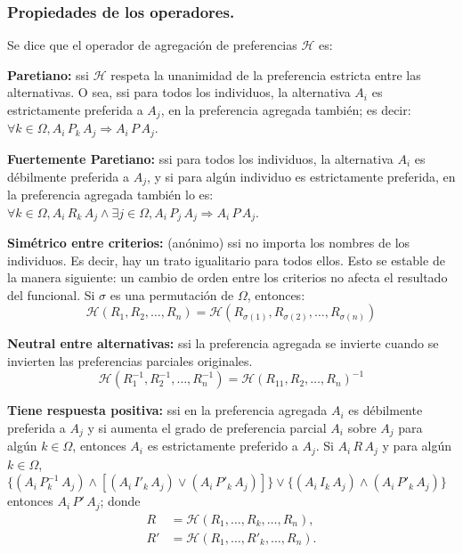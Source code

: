 \documentclass[a5paper,doc,10pt,noapacite]{apa6}
\begin{document}
{{\subsubsection{Propiedades de los operadores.}

Se dice que el operador de agregación de preferencias \(\mathcal{H}\) es:

\begin{APAenumerate}
    \item \textbf{Paretiano:} ssi \(\mathcal{H}\) respeta la unanimidad de la preferencia estricta entre las alternativas. O sea, ssi para todos los individuos, la alternativa \(A_i\) es estrictamente preferida a \(A_j\), en la preferencia agregada también; es decir: \(\forall k \in \Omega, A_i \, P_k \, A_j \Rightarrow A_i \, P \, A_j\).
    
   \vspace{1\baselineskip}
    \item \textbf{Fuertemente Paretiano:} ssi para todos los individuos, la alternativa \(A_i\) es débilmente preferida a \(A_j\), y si para algún individuo es estrictamente preferida, en la preferencia agregada también lo es: \(\forall k \in \Omega, A_i \, R_k \, A_j \wedge \exists j \in \Omega,  A_i \, P_j \, A_j \Rightarrow A_i \, P \, A_j\).
    
    \vspace{1\baselineskip}
    \item \textbf{Simétrico entre criterios:} (anónimo) ssi no importa los nombres de los individuos. Es decir, hay un trato igualitario para todos ellos. Esto se estable de la manera siguiente: un cambio de orden entre los criterios no afecta el resultado del funcional. Si \(\sigma\) es una permutación de \(\Omega\), entonces:
    \[
    	\mathcal{H}(R_1, R_2, \dots, R_n) = \mathcal{H}(R_{\sigma (1)}, R_{\sigma (2)}, \dots, R_{\sigma (n)})
    \]
    
    \vspace{1\baselineskip}
    \item \textbf{Neutral entre alternativas:} ssi la preferencia agregada se invierte cuando se invierten las preferencias parciales originales.
    \[
    	\mathcal{H}(R_1^{-1}, R_2^{-1}, \dots, R_n^{-1}) = \mathcal{H}(R_{11}, R_{2}, \dots, R_{n})^{-1}
    \]
    
    \vspace{1\baselineskip}
    \item \textbf{Tiene respuesta positiva:} ssi en la preferencia agregada \(A_i\) es débilmente preferida a \(A_j\) y si aumenta el grado de preferencia parcial \(A_i\) sobre \(A_j\) para algún \(k \in \Omega\), entonces \(A_i\) es estrictamente preferido a \(A_j\). Si \(A_i \, R \, A_j\) y para algún \(k \in \Omega\), \(\{( A_i \, P_k^{-1} \, A_j) \wedge [( A_i \, I'_k \, A_j) \vee ( A_i \, P'_k \, A_j)]\} \vee \{( A_i \, I_k \, A_j) \wedge ( A_i \, P'_k \, A_j)\}\) entonces \(A_i \, P' \, A_j\); donde
\begin{align*}
	R &= \mathcal{H}(R_1, \dots, R_k, \dots, R_n) ,
	\\
	R' &= \mathcal{H}(R_1, \dots, R'_k, \dots, R_n).
\end{align*}
    

\end{APAenumerate}}}
\end{document}
